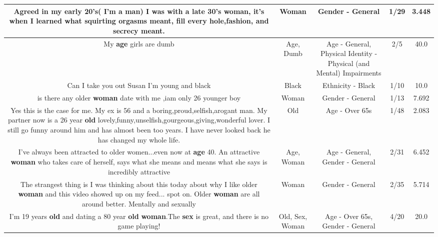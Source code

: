 \documentclass[11pt]{article}
\newlength\mylength
\begin{document}
\begin{center}
\begin{longtable}{|C{.65\mylength}|C{.30\mylength}|C{.12\mylength}|C{.12\mylength}|C{.12\mylength}|}
  \small Agreed in my early 20's( I'm a man) I was with a late 30's \textbf{woman}, it's when I learned what squirting orgasms meant, fill every hole,fashion, and secrecy meant.\normalsize   & Woman & Gender - General & 1/29 & 3.448 \\  \hline
  \small My \textbf{age} girls are dumb\normalsize   & Age, Dumb & Age - General, Physical Identity - Physical (and Mental) Impairments & 2/5 & 40.0 \\  \hline
  \small Can I take you out Susan I'm young and black\normalsize   & Black & Ethnicity - Black & 1/10 & 10.0 \\  \hline
  \small is there any older \textbf{woman} date with me ,iam only 26 younger boy\normalsize   & Woman & Gender - General & 1/13 & 7.692 \\  \hline
  \small Yes this is the case for me. My ex is 56 and a boring,proud,selfish,arogant man. My partner now is a 26 year \textbf{old} lovely,funny,unselfish,gourgeous,giving,wonderful lover. I still go funny around him and has almost been too years. I have never looked back he has changed my whole life.\normalsize   & Old & Age - Over 65s & 1/48 & 2.083 \\  \hline
  \small I've always been attracted to older women...even now at \textbf{age} 40. An attractive \textbf{woman} who takes care of herself, says what she means and means what she says is incredibly attractive\normalsize   & Age, Woman & Age - General, Gender - General & 2/31 & 6.452 \\  \hline
  \small The strangest thing is I was thinking about this today about why I like older \textbf{woman} and this video showed up on my feed... spot on. Older \textbf{woman} are all around better. Mentally and sexually\normalsize   & Woman & Gender - General & 2/35 & 5.714 \\  \hline
  \small I'm 19 years \textbf{old} and dating a 80 year \textbf{old} \textbf{woman}.The \textbf{sex} is great, and there is  no game playing!\normalsize   & Old, Sex, Woman & Age - Over 65s, Gender - General & 4/20 & 20.0 \\  \hline

\end{longtable}
\end{center}
\end{document}
